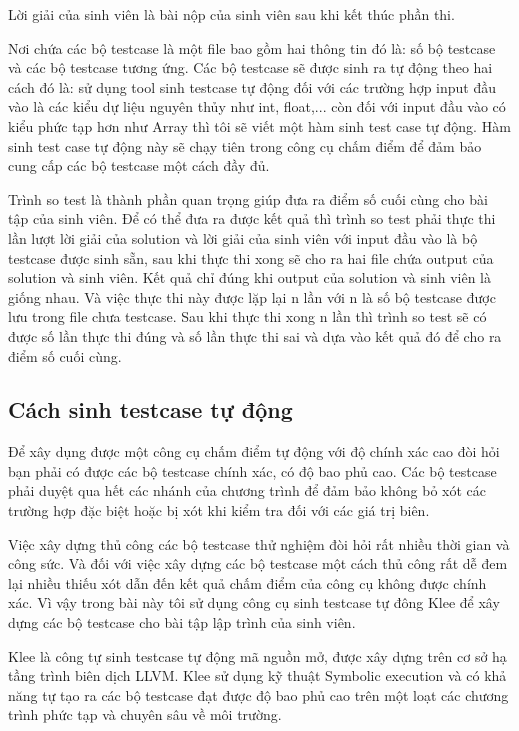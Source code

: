 \documentclass[12pt,a4paper]{article}
\begin{document}
Lời giải của sinh viên là bài nộp của sinh viên sau khi kết thúc phần thi.

Nơi chứa các bộ testcase là một file bao gồm hai thông tin đó là: số bộ testcase và các bộ testcase tương ứng. Các bộ testcase sẽ được sinh ra tự động theo hai cách đó là: sử dụng tool sinh testcase tự động đối với các trường hợp input đầu vào là các kiểu dự liệu nguyên thủy như int, float,... còn đối với input đầu vào có kiểu phức tạp hơn như Array thì tôi sẽ viết một hàm sinh test case tự động. Hàm sinh test case tự động này sẽ chạy tiên trong công cụ chấm điểm để đảm bảo cung cấp các bộ testcase một cách đầy đủ.

Trình so test là thành phần quan trọng giúp đưa ra điểm số cuối cùng cho bài tập của sinh viên. Để có thể đưa ra được kết quả thì trình so test phải thực thi lần lượt lời giải của solution và lời giải của sinh viên với input đầu vào là bộ testcase được sinh sẵn, sau khi thực thi xong sẽ cho ra hai file chứa output của solution và sinh viên. Kết quả chỉ đúng khi output của solution và sinh viên là giống nhau. Và việc thực thi này được lặp lại n lần với n là số bộ testcase được lưu trong file chưa testcase. Sau khi thực thi xong n lần thì trình so test sẽ có được số lần thực thi đúng và số lần thực thi sai và dựa vào kết quả đó để cho ra điểm số cuối cùng.

\subsection{Cách sinh testcase tự động}

Để xây dụng được một công cụ chấm điểm tự động với độ chính xác cao đòi hỏi bạn phải có được các bộ testcase chính xác, có độ bao phủ cao. Các bộ testcase phải duyệt qua hết các nhánh của chương trình để đảm bảo không bỏ xót các trường hợp đặc biệt hoặc bị xót khi kiểm tra đối với các giá trị biên.

Việc xây dựng thủ công các bộ testcase thử nghiệm đòi hỏi rất nhiều thời gian và công sức. Và đối với việc xây dựng các bộ testcase một cách thủ công rất dễ đem lại nhiều thiếu xót dẫn đến kết quả chấm điểm của công cụ không được chính xác. Vì vậy trong bài này tôi sử dụng công cụ sinh testcase tự đông Klee để xây dựng các bộ testcase cho bài tập lập trình của sinh viên.

Klee là công tự sinh testcase tự động mã nguồn mở, được xây dựng trên cơ sở hạ tầng trình biên dịch LLVM. Klee sử dụng kỹ thuật Symbolic execution và có khả năng tự tạo ra các bộ testcase đạt được độ bao phủ cao trên một loạt các chương trình phức tạp và chuyên sâu về môi trường.
\end{document}
